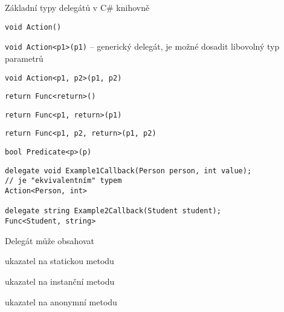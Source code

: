 \begin{frame}[fragile]
\begin{bitemize}{Základní typy delegátů v C\# knihovně}
\item \lstinline|void Action()|
\item \lstinline|void Action<p1>(p1)| -- generický delegát, je možné dosadit libovolný typ parametrů
\item \lstinline|void Action<p1, p2>(p1, p2)|
\item \lstinline|return Func<return>()|
\item \lstinline|return Func<p1, return>(p1)|
\item \lstinline|return Func<p1, p2, return>(p1, p2)|
\item \lstinline|bool Predicate<p>(p)|
\end{bitemize}

\vfill

\begin{yesblock}
\begin{lstlisting}
delegate void Example1Callback(Person person, int value);
// je "ekvivalentním" typem
Action<Person, int>

delegate string Example2Callback(Student student);
Func<Student, string>
\end{lstlisting}
\end{yesblock}
\end{frame}





\begin{frame}[fragile]
\begin{bitemize}{Delegát může obsahovat}
\item ukazatel na statickou metodu
\item ukazatel na instanční metodu
\item ukazatel na anonymní metodu
\end{bitemize}
\end{frame}





